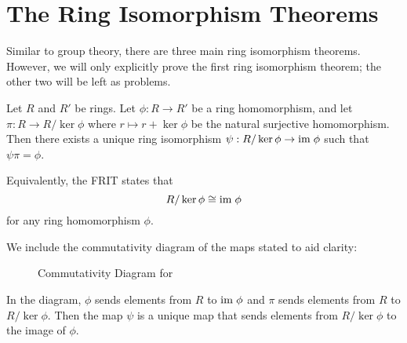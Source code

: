 \section{The Ring Isomorphism Theorems}
Similar to group theory, there are three main ring isomorphism theorems. However, we will only explicitly prove the first ring isomorphism theorem; the other two will be left as problems.

\begin{theorem}\label{thrm-ring-isomorphism-1}
    Let $R$ and $R'$ be rings. Let $\phi: R \to R'$ be a ring homomorphism, and let $\pi: R \to R/\ker\phi$ where $r\mapsto r + \ker\phi$ be the natural surjective homomorphism. Then there exists a unique ring isomorphism $\psi: R / \ker\phi \to \mathrm{im}\;\phi$ such that $\psi\pi = \phi$.
\end{theorem}
\begin{remark}
    Equivalently, the FRIT states that
    \[
        R / \ker\phi \cong \mathrm{im}\;\phi
    \]
    for any ring homomorphism $\phi$.
\end{remark}

We include the commutativity diagram of the maps stated to aid clarity:
\begin{figure}[h]
    \centering
    \caption{Commutativity Diagram for }
\end{figure}

In the diagram, $\phi$ sends elements from $R$ to $\mathrm{im}\;\phi$ and $\pi$ sends elements from $R$ to $R/\ker\phi$. Then the map $\psi$ is a unique map that sends elements from $R/\ker\phi$ to the image of $\phi$.

